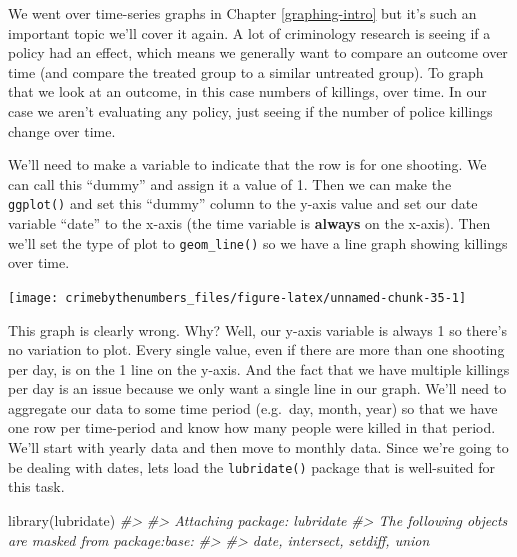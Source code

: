 \documentclass[
  12pt,
  openany]{book}
\newenvironment{Shaded}{\begin{snugshade}}{\end{snugshade}}
\newcommand{\AttributeTok}[1]{\textcolor[rgb]{0.61,0.61,0.61}{#1}}
\newcommand{\CommentTok}[1]{\textcolor[rgb]{0.37,0.37,0.37}{\textit{#1}}}
\newcommand{\DecValTok}[1]{\textcolor[rgb]{0.06,0.06,0.06}{#1}}
\newcommand{\FunctionTok}[1]{\textcolor[rgb]{0,0,0}{#1}}
\newcommand{\NormalTok}[1]{#1}
\newcommand{\OtherTok}[1]{\textcolor[rgb]{0.37,0.37,0.37}{#1}}
\newcommand{\SpecialCharTok}[1]{\textcolor[rgb]{0,0,0}{#1}}
\begin{document}
We went over time-series graphs in Chapter \ref{graphing-intro} but it's such an important topic we'll cover it again. A lot of criminology research is seeing if a policy had an effect, which means we generally want to compare an outcome over time (and compare the treated group to a similar untreated group). To graph that we look at an outcome, in this case numbers of killings, over time. In our case we aren't evaluating any policy, just seeing if the number of police killings change over time.

We'll need to make a variable to indicate that the row is for one shooting. We can call this ``dummy'' and assign it a value of 1. Then we can make the \texttt{ggplot()} and set this ``dummy'' column to the y-axis value and set our date variable ``date'' to the x-axis (the time variable is \textbf{always} on the x-axis). Then we'll set the type of plot to \texttt{geom\_line()} so we have a line graph showing killings over time.

\begin{Shaded}
\end{Shaded}

\begin{center}\texttt{[image: crimebythenumbers\_files/figure-latex/unnamed-chunk-35-1]} \end{center}

This graph is clearly wrong. Why? Well, our y-axis variable is always 1 so there's no variation to plot. Every single value, even if there are more than one shooting per day, is on the 1 line on the y-axis. And the fact that we have multiple killings per day is an issue because we only want a single line in our graph. We'll need to aggregate our data to some time period (e.g.~day, month, year) so that we have one row per time-period and know how many people were killed in that period. We'll start with yearly data and then move to monthly data. Since we're going to be dealing with dates, lets load the \texttt{lubridate()} package that is well-suited for this task.

\begin{Shaded}
\begin{Highlighting}[]
\FunctionTok{library}\NormalTok{(lubridate)}
\CommentTok{\#\textgreater{} }
\CommentTok{\#\textgreater{} Attaching package: \textquotesingle{}lubridate\textquotesingle{}}
\CommentTok{\#\textgreater{} The following objects are masked from \textquotesingle{}package:base\textquotesingle{}:}
\CommentTok{\#\textgreater{} }
\CommentTok{\#\textgreater{}     date, intersect, setdiff, union}
\end{Highlighting}
\end{Shaded}
\end{document}
